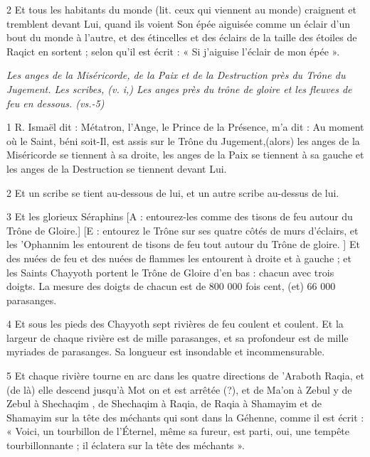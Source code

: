 \par 2 Et tous les habitants du monde (lit. ceux qui viennent au monde) craignent et tremblent devant Lui, quand ils voient Son épée aiguisée comme un éclair d'un bout du monde à l'autre, et des étincelles et des éclairs de la taille des étoiles de Raqict en sortent ; selon qu'il est écrit : « Si j'aiguise l'éclair de mon épée ».



\par \textit{Les anges de la Miséricorde, de la Paix et de la Destruction près du Trône du Jugement. Les scribes, (v. i,) Les anges près du trône de gloire et les fleuves de feu en dessous. (vs.-5)}

\par 1 R. Ismaël dit : Métatron, l'Ange, le Prince de la Présence, m'a dit : Au moment où le Saint, béni soit-Il, est assis sur le Trône du Jugement,(alors) les anges de la Miséricorde se tiennent à sa droite, les anges de la Paix se tiennent à sa gauche et les anges de la Destruction se tiennent devant Lui.

\par 2 Et un scribe se tient au-dessous de lui, et un autre scribe au-dessus de lui.

\par 3 Et les glorieux Séraphins [A : entourez-les comme des tisons de feu autour du Trône de Gloire.] [E : entourez le Trône sur ses quatre côtés de murs d'éclairs, et les 'Ophannim les entourent de tisons de feu tout autour du Trône de gloire. ] Et des nuées de feu et des nuées de flammes les entourent à droite et à gauche ; et les Saints Chayyoth portent le Trône de Gloire d'en bas : chacun avec trois doigts. La mesure des doigts de chacun est de 800 000 fois cent, (et) 66 000 parasanges.

\par 4 Et sous les pieds des Chayyoth sept rivières de feu coulent et coulent. Et la largeur de chaque rivière est de mille parasanges, et sa profondeur est de mille myriades de parasanges. Sa longueur est insondable et incommensurable.

\par 5 Et chaque rivière tourne en arc dans les quatre directions de 'Araboth Raqia, et (de là) elle descend jusqu'à Mot on et est arrêtée (?), et de Ma'on à Zebul y de Zebul à Shechaqim , de Shechaqim à Raqia, de Raqia à Shamayim et de Shamayim sur la tête des méchants qui sont dans la Géhenne, comme il est écrit : « Voici, un tourbillon de l'Éternel, même sa fureur, est parti, oui, une tempête tourbillonnante ; il éclatera sur la tête des méchants ».

